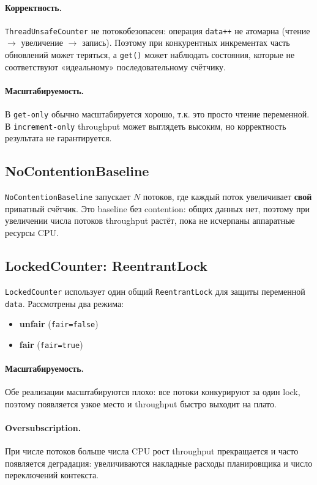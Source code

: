 \documentclass[a4paper,12pt]{article}
\begin{document}
\paragraph{Корректность.}
\texttt{ThreadUnsafeCounter} не потокобезопасен: операция \texttt{data++} не атомарна
(чтение $\rightarrow$ увеличение $\rightarrow$ запись). Поэтому при конкурентных инкрементах
часть обновлений может теряться, а \texttt{get()} может наблюдать состояния, которые не соответствуют
«идеальному» последовательному счётчику.

\paragraph{Масштабируемость.}
В \texttt{get-only} обычно масштабируется хорошо, т.к. это просто чтение переменной.
В \texttt{increment-only} throughput может выглядеть высоким, но корректность результата не гарантируется.

\subsection{NoContentionBaseline}

\texttt{NoContentionBaseline} запускает $N$ потоков, где каждый поток увеличивает \textbf{свой} приватный счётчик.
Это baseline без contention: общих данных нет, поэтому при увеличении числа потоков throughput растёт,
пока не исчерпаны аппаратные ресурсы CPU.

\subsection{LockedCounter: ReentrantLock}

\texttt{LockedCounter} использует один общий \texttt{ReentrantLock} для защиты переменной \texttt{data}.
Рассмотрены два режима:
\begin{itemize}
  \item \textbf{unfair} (\texttt{fair=false})
  \item \textbf{fair} (\texttt{fair=true})
\end{itemize}

\paragraph{Масштабируемость.}
Обе реализации масштабируются плохо: все потоки конкурируют за один lock,
поэтому появляется узкое место и throughput быстро выходит на плато.

\paragraph{Oversubscription.}
При числе потоков больше числа CPU рост throughput прекращается и часто появляется деградация:
увеличиваются накладные расходы планировщика и число переключений контекста.
\end{document}

